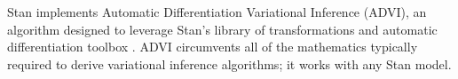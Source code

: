 Stan implements Automatic Differentiation Variational Inference (ADVI), an
algorithm designed to leverage Stan's library of transformations and automatic
differentiation toolbox \citep{Kucukelbir:2015}. ADVI circumvents all of the
mathematics typically required to derive variational inference algorithms; it
works with any Stan model.
